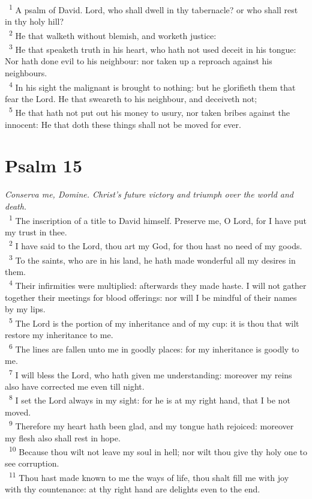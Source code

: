 \documentclass[a5paper,12pt]{article}
\begin{document}
\begin{multicols*}{2}
~\textsuperscript{1} A psalm of David. Lord, who shall dwell in thy tabernacle? or who shall rest in thy holy hill?\\
~\textsuperscript{2} He that walketh without blemish, and worketh justice:\\
~\textsuperscript{3} He that speaketh truth in his heart, who hath not used deceit in his tongue: Nor hath done evil to his neighbour: nor taken up a reproach against his neighbours.\\
~\textsuperscript{4} In his sight the malignant is brought to nothing: but he glorifieth them that fear the Lord. He that sweareth to his neighbour, and deceiveth not;\\
~\textsuperscript{5} He that hath not put out his money to usury, nor taken bribes against the innocent: He that doth these things shall not be moved for ever.\\

\section{Psalm 15}
\label{sec:orgcb232eb}
\emph{Conserva me, Domine. Christ's future victory and triumph over the world and death.}\\

~\textsuperscript{1} The inscription of a title to David himself. Preserve me, O Lord, for I have put my trust in thee.\\
~\textsuperscript{2} I have said to the Lord, thou art my God, for thou hast no need of my goods.\\
~\textsuperscript{3} To the saints, who are in his land, he hath made wonderful all my desires in them.\\
~\textsuperscript{4} Their infirmities were multiplied: afterwards they made haste. I will not gather together their meetings for blood offerings: nor will I be mindful of their names by my lips.\\
~\textsuperscript{5} The Lord is the portion of my inheritance and of my cup: it is thou that wilt restore my inheritance to me.\\
~\textsuperscript{6} The lines are fallen unto me in goodly places: for my inheritance is goodly to me.\\
~\textsuperscript{7} I will bless the Lord, who hath given me understanding: moreover my reins also have corrected me even till night.\\
~\textsuperscript{8} I set the Lord always in my sight: for he is at my right hand, that I be not moved.\\
~\textsuperscript{9} Therefore my heart hath been glad, and my tongue hath rejoiced: moreover my flesh also shall rest in hope.\\
~\textsuperscript{10} Because thou wilt not leave my soul in hell; nor wilt thou give thy holy one to see corruption.\\
~\textsuperscript{11} Thou hast made known to me the ways of life, thou shalt fill me with joy with thy countenance: at thy right hand are delights even to the end.\\


\end{multicols*}
\end{document}

